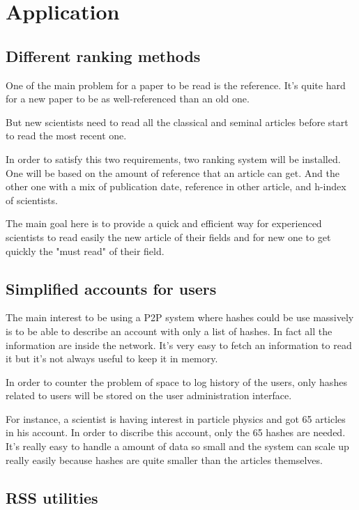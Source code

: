 \section{Application}

\subsection{Different ranking methods}

One of the main problem for a paper to be read is the reference. It's
quite hard for a new paper to be as well-referenced than an old one.

But new scientists need to read all the classical and seminal 
articles before start to read the most recent one.

In order to satisfy this two requirements, two ranking system will
be installed. One will be based on the amount of reference that an
article can get. And the other one with a mix of publication date,
reference in other article, and h-index of scientists.

The main goal here is to provide a quick and efficient way for
experienced scientists to read easily the new article of their fields
and for new one to get quickly the "must read" of their field.

\subsection{Simplified accounts for users}

The main interest to be using a P2P system where hashes could be use massively is
to be able to describe an account with only a list of hashes.
In fact all the information are inside the network. It's very easy to fetch an information
to read it but it's not always useful to keep it in memory.

In order to counter the problem of space to log history of the users, only hashes
related to users will be stored on the user administration interface.

For instance, a scientist is having interest in particle physics and got 65
articles in his account. In order to discribe this account, only the 65 hashes are needed.
It's really easy to handle a amount of data so small and the system can scale up really easily
because hashes are quite smaller than the articles themselves.

\subsection{RSS utilities}

